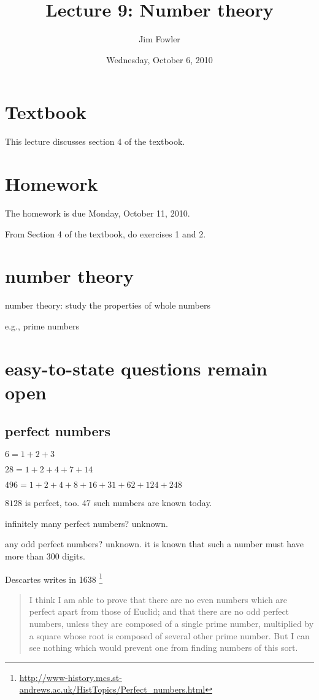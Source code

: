 \documentclass[12pt]{handout}
\title{Lecture 9: Number theory}
\author{Jim Fowler}
\date{Wednesday, October  6, 2010}
\begin{document}
\maketitle

\section*{Textbook}

This lecture discusses section 4 of the textbook.

\section*{Homework} 

The homework is due Monday, October 11, 2010.

From Section 4 of the textbook, do exercises 1 and 2.

\section*{number theory}

number theory: study the properties of whole numbers

e.g., prime numbers

\section*{easy-to-state questions remain open}

\subsection*{perfect numbers}

$6 = 1 + 2 + 3$

$28 = 1 + 2 + 4 + 7 + 14$

$496 = 1+ 2+ 4+ 8+ 16+ 31+ 62+ 124+ 248$

$8128$ is perfect, too.  47 such numbers are known today.

infinitely many perfect numbers?  unknown.

any odd perfect numbers?  unknown.  it is known that such a number
must have more than 300 digits.

Descartes writes in 1638 \footnote{\url{http://www-history.mcs.st-andrews.ac.uk/HistTopics/Perfect_numbers.html}}
\begin{quote}
I think I am able to prove that there are no even numbers which are perfect apart from those of Euclid; and that there are no odd perfect numbers, unless they are composed of a single prime number, multiplied by a square whose root is composed of several other prime number. But I can see nothing which would prevent one from finding numbers of this sort.
\end{quote}
\end{document}
